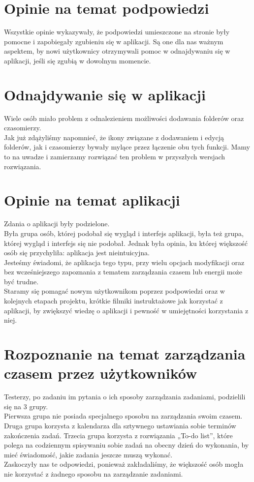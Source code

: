 \documentclass[a4paper,11pt]{report}
\begin{document}
\section{Opinie na temat podpowiedzi}
Wszystkie opinie wykazywały, że podpowiedzi umieszczone na stronie były pomocne i zapobiegały zgubieniu się w aplikacji.
Są one dla nas ważnym aspektem, by nowi użytkownicy otrzymywali pomoc w odnajdywaniu się w aplikacji, jeśli się zgubią w dowolnym momencie.
\section{Odnajdywanie się w aplikacji}
Wiele osób miało problem z odnalezieniem możliwości dodawania folderów oraz czasomierzy.\\
Jak już zdążyliśmy napomnieć, że ikony związane z dodawaniem i edycją folderów,
 jak i czasomierzy bywały mylące przez łączenie obu tych funkcji.
Mamy to na uwadze i zamierzamy rozwiązać ten problem w przyszłych wersjach rozwiązania.
\section{Opinie na temat aplikacji}
Zdania o aplikacji były podzielone.\\
Była grupa osób, której podobał się wygląd i interfejs aplikacji, była też grupa, której wygląd i interfejs się nie podobał.
Jednak była opinia, ku której większość osób się przychyliła: aplikacja jest nieintuicyjna.\\
Jesteśmy świadomi, że aplikacja tego typu,
 przy wielu opcjach modyfikacji oraz bez wcześniejszego zapoznania z tematem zarządzania czasem lub energii może być trudne.\\
Staramy się pomagać nowym użytkownikom poprzez podpowiedzi oraz w kolejnych etapach projektu,
 krótkie filmiki instruktażowe jak korzystać z aplikacji, by zwiększyć wiedzę o aplikacji i pewność w umiejętności korzystania z niej. 
\section{Rozpoznanie na temat zarządzania czasem przez użytkowników}
Testerzy, po zadaniu im pytania o ich sposoby zarządzania zadaniami, podzielili się na 3 grupy.\\
Pierwsza grupa nie posiada specjalnego sposobu na zarządzania swoim czasem. 
Druga grupa korzysta z kalendarza dla sztywnego ustawiania sobie terminów zakończenia zadań.
Trzecia grupa korzysta z rozwiązania „To-do list”,
 które polega na codziennym spisywaniu sobie zadań na obecny dzień do wykonania, by mieć świadomość, jakie zadania jeszcze muszą wykonać.\\
Zaskoczyły nas te odpowiedzi, ponieważ zakładaliśmy, że większość osób mogła nie korzystać z żadnego sposobu na zarządzanie zadaniami.\\
\end{document}
